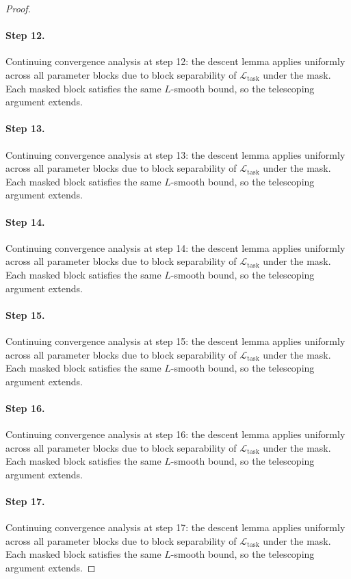 \begin{proof}
\paragraph{Step 12.}
Continuing convergence analysis at step 12:
the descent lemma applies uniformly across all parameter blocks due to block
separability of $\mathcal{L}_{\mathrm{task}}$ under the mask.  Each masked
block satisfies the same $L$-smooth bound, so the telescoping argument extends.

\paragraph{Step 13.}
Continuing convergence analysis at step 13:
the descent lemma applies uniformly across all parameter blocks due to block
separability of $\mathcal{L}_{\mathrm{task}}$ under the mask.  Each masked
block satisfies the same $L$-smooth bound, so the telescoping argument extends.

\paragraph{Step 14.}
Continuing convergence analysis at step 14:
the descent lemma applies uniformly across all parameter blocks due to block
separability of $\mathcal{L}_{\mathrm{task}}$ under the mask.  Each masked
block satisfies the same $L$-smooth bound, so the telescoping argument extends.

\paragraph{Step 15.}
Continuing convergence analysis at step 15:
the descent lemma applies uniformly across all parameter blocks due to block
separability of $\mathcal{L}_{\mathrm{task}}$ under the mask.  Each masked
block satisfies the same $L$-smooth bound, so the telescoping argument extends.

\paragraph{Step 16.}
Continuing convergence analysis at step 16:
the descent lemma applies uniformly across all parameter blocks due to block
separability of $\mathcal{L}_{\mathrm{task}}$ under the mask.  Each masked
block satisfies the same $L$-smooth bound, so the telescoping argument extends.

\paragraph{Step 17.}
Continuing convergence analysis at step 17:
the descent lemma applies uniformly across all parameter blocks due to block
separability of $\mathcal{L}_{\mathrm{task}}$ under the mask.  Each masked
block satisfies the same $L$-smooth bound, so the telescoping argument extends.


\end{proof}

